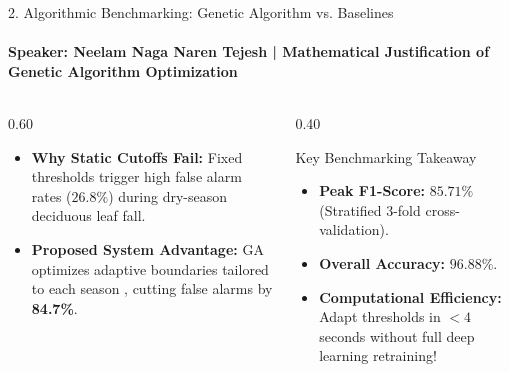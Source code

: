 \documentclass[aspectratio=169, 11pt]{beamer}
\let\oldcite\cite
\renewcommand{\cite}[1]{\hyperlink{ref:references_slide}{\textcolor{amritaMaroon}{\oldcite{#1}}}}
\begin{document}
\begin{frame}{2. Algorithmic Benchmarking: Genetic Algorithm vs. Baselines}
    \framesubtitle{\textbf{\textcolor{amritaGold}{Speaker: Neelam Naga Naren Tejesh}} \quad | \quad Mathematical Justification of Genetic Algorithm Optimization}
    \begin{columns}[c]
        \begin{column}{0.60\textwidth}
            \begin{table}
                \centering
            \end{table}
            \vspace{0.1cm}
            \footnotesize
            \begin{itemize}
                \item \textbf{Why Static Cutoffs Fail:} Fixed thresholds trigger high false alarm rates ($26.8\%$) during dry-season deciduous leaf fall.
                \item \textbf{Proposed System Advantage:} GA optimizes adaptive boundaries tailored to each season \cite{deb2002fast}, cutting false alarms by \textbf{84.7\%}.
            \end{itemize}
        \end{column}
        \begin{column}{0.40\textwidth}
            \begin{exampleblock}{Key Benchmarking Takeaway}
                \small
                \begin{itemize}
                    \item \textbf{Peak F1-Score:} $\mathbf{85.71\%}$ (Stratified 3-fold cross-validation).
                    \item \textbf{Overall Accuracy:} $\mathbf{96.88\%}$.
                    \item \textbf{Computational Efficiency:} Adapt thresholds in $<4$ seconds without full deep learning retraining!
                \end{itemize}
            \end{exampleblock}
        \end{column}
    \end{columns}
\end{frame}
\end{document}

